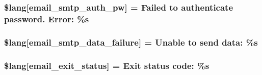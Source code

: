 \subsubsection[{\$lang}]{\setlength{\rightskip}{0pt plus 5cm}\$lang\mbox{[}\textquotesingle{}email\+\_\+smtp\+\_\+auth\+\_\+pw\textquotesingle{}\mbox{]} = \textquotesingle{}Failed to authenticate password. Error\+: \%s\textquotesingle{}}\label{system_2language_2english_2email__lang_8php_a09fd123f0d251a8eac845f985c6583c3}
\hypertarget{system_2language_2english_2email__lang_8php_a59801e23c2d745400384098c7bf0a6dc}{}
\subsubsection[{\$lang}]{\setlength{\rightskip}{0pt plus 5cm}\$lang\mbox{[}\textquotesingle{}email\+\_\+smtp\+\_\+data\+\_\+failure\textquotesingle{}\mbox{]} = \textquotesingle{}Unable to send data\+: \%s\textquotesingle{}}\label{system_2language_2english_2email__lang_8php_a59801e23c2d745400384098c7bf0a6dc}
\hypertarget{system_2language_2english_2email__lang_8php_a32b0c2f50acd03defc88df937ee2877f}{}
\subsubsection[{\$lang}]{\setlength{\rightskip}{0pt plus 5cm}\$lang\mbox{[}\textquotesingle{}email\+\_\+exit\+\_\+status\textquotesingle{}\mbox{]} = \textquotesingle{}Exit status code\+: \%s\textquotesingle{}}\label{system_2language_2english_2email__lang_8php_a32b0c2f50acd03defc88df937ee2877f}
